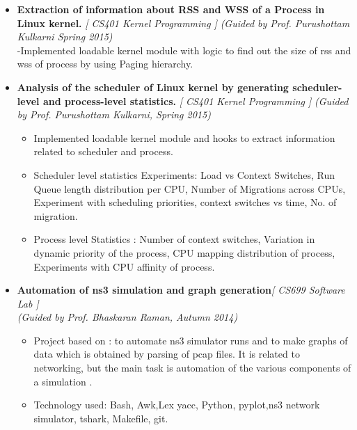 \begin{itemize}
	\item \textbf{Extraction of information about RSS and WSS of a Process in Linux kernel.} \hfill \emph{[ CS401 Kernel Programming ]}\hfill 
	\emph{(Guided by Prof. Purushottam Kulkarni Spring 2015)} \\
	-Implemented loadable kernel module with logic to find out the size of rss and wss of process by using Paging hierarchy. \\[-0.6cm]
	\item \textbf{Analysis of the scheduler of Linux kernel by generating scheduler-level and process-level statistics.} \hfill \emph{[ CS401 Kernel Programming ]} \hfill
	\emph{(Guided by Prof. Purushottam Kulkarni, Spring 2015)}\hfill \\[-0.7cm]
	\begin{itemize}
	 \item Implemented loadable kernel module and hooks to extract information related to scheduler and process.\\[-0.6cm]
	 \item Scheduler level statistics Experiments: Load vs Context Switches, Run Queue length distribution per CPU, Number of Migrations across CPUs, Experiment with scheduling priorities, context switches vs time, No. of migration.\\[-0.6cm]
	 \item Process level Statistics : Number of context switches, Variation in dynamic priority of the process, CPU mapping distribution of process, Experiments with CPU affinity of process.\\[-0.6cm]
	\end{itemize}
	\item \textbf{Automation of ns3 simulation and graph generation}\hfill\emph{[ CS699 Software Lab ]}  \\
	\emph{(Guided by Prof. Bhaskaran Raman, Autumn 2014)}  \\[-0.6cm]
	\begin{itemize}
	 \item Project based on : to automate ns3 simulator runs and to make graphs of data which is obtained by parsing of pcap
files. It is related to networking, but the main task is automation of the various components of a simulation .
	 \item Technology used: Bash, Awk,Lex yacc, Python, pyplot,ns3 network simulator, tshark, Makefile, git.
	\end{itemize}

\end{itemize}
